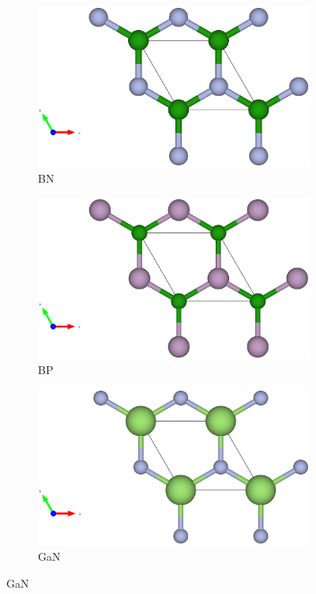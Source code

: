 \begin{figure}[htb]
    \centering %
\begin{subfigure}{0.3\textwidth}
  \includegraphics[width=\linewidth]{images/bn_st_2d.eps}
  \caption{BN}
\end{subfigure}\hfil %
\begin{subfigure}{0.3\textwidth}
  \includegraphics[width=\linewidth]{images/bp_st_2d.eps}
  \caption{BP}
\end{subfigure}\hfil %
\begin{subfigure}{0.3\textwidth}
  \includegraphics[width=\linewidth]{images/gan_st_2d.eps}
  \caption{GaN}
\end{subfigure}


\end{figure}
